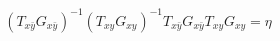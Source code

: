 \begin{equation}
\label{TxyTxyeta}
(T_{x\bar y}G_{x\bar y})^{-1} (T_{xy}G_{xy})^{-1}
T_{x\bar y}G_{x\bar y} T_{xy}G_{xy}  =\eta
\end{equation}

